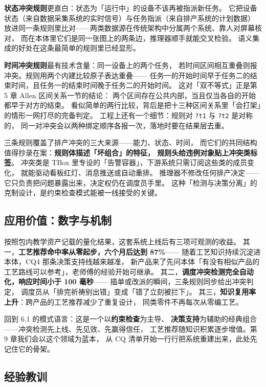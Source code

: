 \textbf{状态冲突规则}更直白：状态为「运行中」的设备不该再被指派新任务。
它把设备状态（来自数据采集系统的实时信号）与任务指派（来自排产系统的计划数据）
放进同一条规则里比对——两类数据源在传统架构中分属两个系统、靠人对屏幕核对，
而在本体里它们是同一张图上的两条边，推理器顺手就能交叉检验。
语义集成的好处在这条最简单的规则里已经显形。

\textbf{时间冲突规则}最有技术含量：同一设备上的两个任务，
若时间区间相互重叠则报冲突。规则用两个内建比较原子表达重叠——
任务一的开始时间早于任务二的结束时间，且任务一的结束时间晚于任务二的开始时间。
这对「双不等式」正是第 5 章 Allen 区间关系一节的结论：
两个区间存在公共内部，当且仅当各自的开始都早于对方的结束。
看似简单的两行比较，背后是把十三种区间关系里「会打架」的情形一网打尽的完备判定。
工程上还有一个细节：规则对 \texttt{?t1} 与 \texttt{?t2} 是对称的，
同一对冲突会以两种绑定顺序各报一次，落地时要在结果层去重。

三条规则覆盖了排产冲突的三大来源——能力、状态、时间，
而它们的共同结构值得抄录在案：\textbf{规则体描述「坏组合」的特征，
规则头给违例对象贴上冲突类标签}。
冲突类是 TBox 里专设的「告警容器」，下游系统只需订阅这些类的成员变化，
就能驱动看板红灯、消息推送或自动重排。
推理器不修改任何排产决定——它只负责把问题暴露出来，决定权仍在调度员手里。
这种「检测与决策分离」的克制设计，是约束检查模式能被一线接受的关键。

\subsection{应用价值：数字与机制}

按照包内教学资产记载的量化结果，这套系统上线后有三项可观测的收益。
其一，\textbf{工艺推荐命中率从零起步，六个月后达到 87\%}——
随着工艺知识持续沉淀进本体，CQ4 那条决策支持线越来越准，
新产品来了先问本体「有没有相似产品的工艺路线可以参考」，老师傅的经验开始可继承。
其二，\textbf{调度冲突检测完全自动化，响应时间小于 100 毫秒}——
插单或改派的瞬间，三条规则同步给出冲突判定，
调度员从「排完祈祷别出错」变成「错了立刻被拦下」。
其三，\textbf{知识复用率上升}：跨产品的工艺推荐减少了重复设计，
同类零件不再每次从零编工艺。

回到 6.1 的模式语言：这是一个以\textbf{约束检查}为主导、
\textbf{决策支持}为辅助的经典组合——冲突检测先上线、先见效、先赢得信任，
工艺推荐随知识积累逐步增值。第 9 章我们会以这个领域为蓝本，
从 CQ 清单开始一行行把系统重建出来，此处先记住它的骨架。

\subsection{经验教训}


